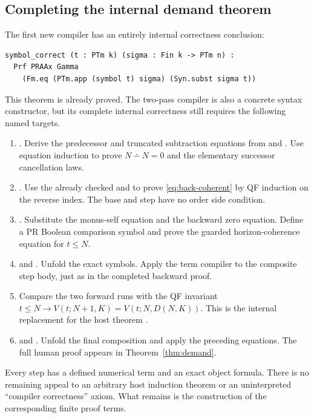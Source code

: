 \subsection{Completing the internal demand theorem}

The first new compiler has an entirely internal correctness conclusion:
\begin{lstlisting}
symbol_correct (t : PTm k) (sigma : Fin k -> PTm n) :
  Prf PRAAx Gamma
    (Fm.eq (PTm.app (symbol t) sigma) (Syn.subst sigma t))
\end{lstlisting}
This theorem is already proved. The two-pass compiler is also a
concrete syntax constructor, but its complete internal correctness
still requires the following named targets.

\begin{enumerate}
\item {}. Derive the predecessor and truncated
subtraction equations from  and
. Use equation induction to prove
\(N\dotminus N=0\) and the elementary successor cancellation laws.
\item {}. Use the already checked
 and  to prove
\eqref{eq:back-coherent} by QF induction on the reverse index. The
base and step have no order side condition.
\item {}. Substitute the monus-self equation
and the backward zero equation. Define a PR Boolean comparison symbol
and prove the guarded horizon-coherence equation for \(t\le N\).
\item {} and . Unfold
the exact  symbols. Apply the term compiler to the
composite step body, just as in the completed backward proof.
\item Compare the two forward runs with the QF invariant
\(t\le N\to V(t;N+1,K)=V(t;N,D(N,K))\). This is the internal
replacement for the host theorem .
\item {} and .
Unfold the final composition and apply the preceding equations.
The full human proof appears in Theorem~\ref{thm:demand}.
\end{enumerate}

Every step has a defined numerical term and an exact object formula.
There is no remaining appeal to an arbitrary host induction theorem or
an uninterpreted ``compiler correctness'' axiom. What remains is the
construction of the corresponding finite proof terms.

